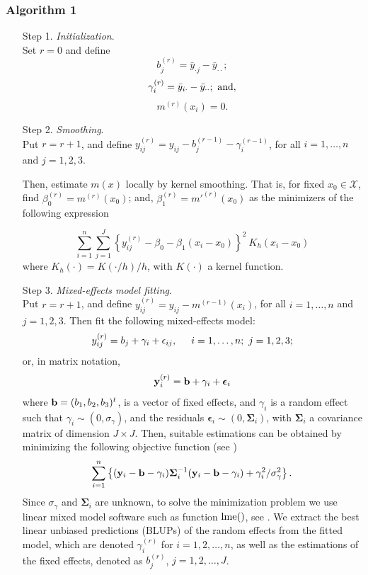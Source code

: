 \documentclass[sn-mathphys]{sn-jnl}%
\theoremstyle{thmstyleone}%
\theoremstyle{thmstyletwo}%
\theoremstyle{thmstylethree}%
\begin{document}
\subsubsection*{ Algorithm 1}
\begin{enumerate}
\item[Step 1.] \textit{Initialization}. \\
 \noindent Set $r=0$ and define
$$b_j^{(r)}=\bar{y}_{\cdot j}-\bar{y}_{\cdot \cdot};$$
$$\gamma_i^{(r)}=\bar{y}_{i \cdot}-\bar{y}_{\cdot \cdot};\ {\rm and}, $$
$$m^{(r)}(x_i)=0.$$ 

\item[Step 2.]  \textit{Smoothing}.\\
\noindent Put $r=r+1$, and define $y_{ij}^{(r)}=y_{ij}-b_j^{(r-1)}-\gamma_i^{(r-1)}$, for all $i=1, \ldots, n$ and $j=1,2,3$.

Then, estimate $m(x)$ locally by kernel smoothing. That is, for fixed $x_0 \in \mathcal{X}$, find ${\beta}^{(r)}_0={m}^{(r)}(x_0)$; and, ${\beta}^{(r)}_1={m'}^{(r)}(x_0)$ as the minimizers of the following expression

\begin{equation*}
\sum_{i=1}^n\sum_{j=1}^J\left\{y_{ij}^{(r)}-\beta_0-\beta_1(x_i-x_0)\right\}^2 \ K_h\left(x_i-x_0\right)%
\end{equation*} 
where $K_h(\cdot)=K(\cdot/h)/h$, with $K(\cdot)$ a kernel function. \


\item[Step 3.] \textit{Mixed-effects model fitting}. \\
\noindent Put $r=r+1$, and define $y_{ij}^{(r)}=y_{ij}-{m}^{(r-1)}(x_i)$, for all $i=1, \ldots, n$ and $j=1,2,3$. 
Then fit the following mixed-effects model:
\[
y_{ij}^{(r)}= b_j +\gamma_i + \epsilon_{ij}, \hspace{0.5cm} i=1, \ldots, n; \ j=1,2,3;
\]
or, in matrix notation,
\[
{\bf y}_{i}^{(r)} = {\bf b} +\gamma_i + {\boldsymbol \epsilon}_i
\]
where ${\bf b}=(b_1,b_2,b_3)^t$, is a vector of fixed effects, and $\gamma_i$ is a random effect such that $\gamma_i \sim (0, \sigma_{\gamma})$, and the residuals ${\boldsymbol \epsilon}_{i} \sim (0,{\mathbf \Sigma}_i)$, with ${\mathbf \Sigma}_i$ a covariance matrix of dimension $J \times J$. Then, suitable estimations can be obtained by minimizing the following objective function (see \cite{DG2003})
\[
\sum_{i=1}^n \left\{ ({\bf y}_i-{\bf b}-\gamma_i) {\mathbf \Sigma}_i^{-1}({\bf y}_i-{\bf b}-\gamma_i)+ \gamma_i^2/\sigma_{\gamma}^2\right\}.
\]
Since $\sigma_{\gamma}$ and ${\mathbf \Sigma}_{i}$ are unknown, to solve the minimization problem we use linear mixed model software such as function ${\rm lme} ()$, see \cite{PB2000}. We extract the 
 best linear unbiased predictions (BLUPs) of the random effects from the fitted model, which are denoted $\gamma_{i}^{(r)}$ for $i=1, 2, \ldots, n$, as well as the estimations of the fixed effects, denoted as $b_{j}^{(r)}$, $j=1,2,\ldots, J$. 



\end{enumerate}
\end{document}
